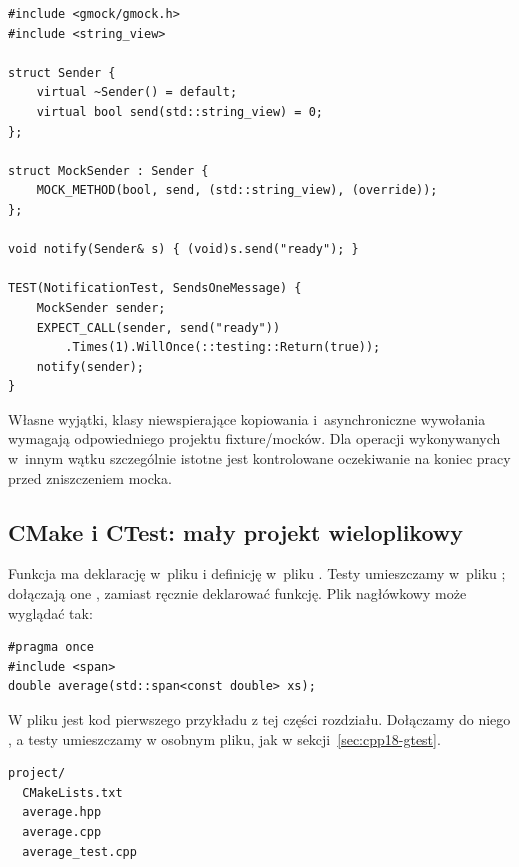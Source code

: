 \begin{lstlisting}[caption={GoogleMock: sprawdzenie pojedynczego wywolania.}]
#include <gmock/gmock.h>
#include <string_view>

struct Sender {
    virtual ~Sender() = default;
    virtual bool send(std::string_view) = 0;
};

struct MockSender : Sender {
    MOCK_METHOD(bool, send, (std::string_view), (override));
};

void notify(Sender& s) { (void)s.send("ready"); }

TEST(NotificationTest, SendsOneMessage) {
    MockSender sender;
    EXPECT_CALL(sender, send("ready"))
        .Times(1).WillOnce(::testing::Return(true));
    notify(sender);
}
\end{lstlisting}

Własne wyjątki, klasy niewspierające kopiowania i~asynchroniczne
wywołania wymagają odpowiedniego projektu fixture/mocków.
Dla operacji wykonywanych w~innym wątku szczególnie istotne jest
kontrolowane oczekiwanie na koniec pracy przed zniszczeniem mocka.

\subsection{CMake i CTest: mały projekt wieloplikowy}
\label{sec:cpp18-cmake-test}

Funkcja  ma deklarację w~pliku 
i definicję w~pliku . Testy umieszczamy w~pliku
; dołączają one , zamiast
ręcznie deklarować funkcję. Plik nagłówkowy może wyglądać tak:

\begin{lstlisting}[caption={Plik average.hpp: deklaracja API testowanej funkcji.}]
#pragma once
#include <span>
double average(std::span<const double> xs);
\end{lstlisting}

W pliku  jest kod pierwszego przykładu z tej części
rozdziału. Dołączamy do niego , a testy umieszczamy
w osobnym pliku, jak w sekcji~\ref{sec:cpp18-gtest}.

\begin{lstlisting}[language=bash,caption={Struktura projektu z GoogleTest.}]
project/
  CMakeLists.txt
  average.hpp
  average.cpp
  average_test.cpp
\end{lstlisting}


